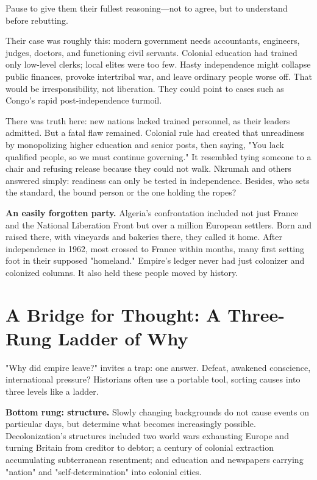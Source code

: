 Pause to give them their fullest reasoning---not to agree, but to understand before rebutting.

Their case was roughly this: modern government needs accountants, engineers, judges, doctors, and functioning civil servants. Colonial education had trained only low-level clerks; local elites were too few. Hasty independence might collapse public finances, provoke intertribal war, and leave ordinary people worse off. That would be irresponsibility, not liberation. They could point to cases such as Congo's rapid post-independence turmoil.

There was truth here: new nations lacked trained personnel, as their leaders admitted. But a fatal flaw remained. Colonial rule had created that unreadiness by monopolizing higher education and senior posts, then saying, "You lack qualified people, so we must continue governing." It resembled tying someone to a chair and refusing release because they could not walk. Nkrumah and others answered simply: readiness can only be tested in independence. Besides, who sets the standard, the bound person or the one holding the ropes?

\textbf{An easily forgotten party.} Algeria's confrontation included not just France and the National Liberation Front but over a million European settlers. Born and raised there, with vineyards and bakeries there, they called it home. After independence in 1962, most crossed to France within months, many first setting foot in their supposed "homeland." Empire's ledger never had just colonizer and colonized columns. It also held these people moved by history.

\section{A Bridge for Thought: A Three-Rung Ladder of Why}
"Why did empire leave?" invites a trap: one answer. Defeat, awakened conscience, international pressure? Historians often use a portable tool, sorting causes into three levels like a ladder.

\textbf{Bottom rung: structure.} Slowly changing backgrounds do not cause events on particular days, but determine what becomes increasingly possible. Decolonization's structures included two world wars exhausting Europe and turning Britain from creditor to debtor; a century of colonial extraction accumulating subterranean resentment; and education and newspapers carrying "nation" and "self-determination" into colonial cities.

